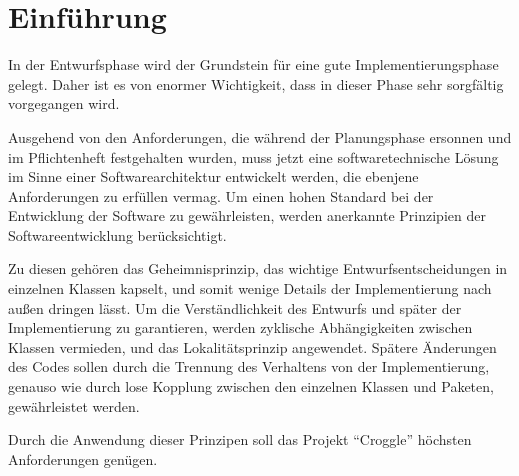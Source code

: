 \chapter{Einführung}

In der Entwurfsphase wird der Grundstein für eine gute Implementierungsphase gelegt.
Daher ist es von enormer Wichtigkeit, dass in dieser Phase sehr sorgfältig vorgegangen wird.

Ausgehend von den Anforderungen, die während der Planungsphase ersonnen und im Pflichtenheft festgehalten wurden, muss jetzt eine softwaretechnische Lösung im Sinne einer Softwarearchitektur entwickelt werden, die ebenjene Anforderungen zu erfüllen vermag.
Um einen hohen Standard bei der Entwicklung der Software zu gewährleisten, werden anerkannte Prinzipien der Softwareentwicklung berücksichtigt.

Zu diesen gehören das Geheimnisprinzip, das wichtige Entwurfsentscheidungen in einzelnen Klassen kapselt, und somit wenige Details der Implementierung nach außen dringen lässt.
Um die Verständlichkeit des Entwurfs und später der Implementierung zu garantieren, werden zyklische Abhängigkeiten zwischen Klassen vermieden, und das Lokalitätsprinzip angewendet.
Spätere Änderungen des Codes sollen durch die Trennung des Verhaltens von der Implementierung, genauso wie durch lose Kopplung zwischen den einzelnen Klassen und Paketen, gewährleistet werden.

Durch die Anwendung dieser Prinzipen soll das Projekt "`Croggle"' höchsten Anforderungen genügen.

